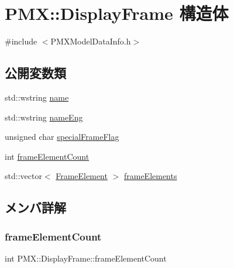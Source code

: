 \hypertarget{struct_p_m_x_1_1_display_frame}{}\section{P\+MX\+:\+:Display\+Frame 構造体}
\label{struct_p_m_x_1_1_display_frame}


{\ttfamily \#include $<$P\+M\+X\+Model\+Data\+Info.\+h$>$}

\subsection*{公開変数類}
\begin{DoxyCompactItemize}
\item 
std\+::wstring \mbox{\hyperlink{struct_p_m_x_1_1_display_frame_a992eec972457e08ec6033f62c160a879}{name}}
\item 
std\+::wstring \mbox{\hyperlink{struct_p_m_x_1_1_display_frame_ab0c21023265d4508c83967d49a5a2c38}{name\+Eng}}
\item 
unsigned char \mbox{\hyperlink{struct_p_m_x_1_1_display_frame_a24db6f89f717766ca52517681c8ab794}{special\+Frame\+Flag}}
\item 
int \mbox{\hyperlink{struct_p_m_x_1_1_display_frame_ab451fc6b812b450f5767aaf0f162bd76}{frame\+Element\+Count}}
\item 
std\+::vector$<$ \mbox{\hyperlink{struct_p_m_x_1_1_frame_element}{Frame\+Element}} $>$ \mbox{\hyperlink{struct_p_m_x_1_1_display_frame_a123aaecf0520ed3b6dac52ca4467823e}{frame\+Elements}}
\end{DoxyCompactItemize}


\subsection{メンバ詳解}
\mbox{\label{struct_p_m_x_1_1_display_frame_ab451fc6b812b450f5767aaf0f162bd76}} 
\subsubsection{\texorpdfstring{frame\+Element\+Count}{frameElementCount}}
{\footnotesize\ttfamily int P\+M\+X\+::\+Display\+Frame\+::frame\+Element\+Count}

